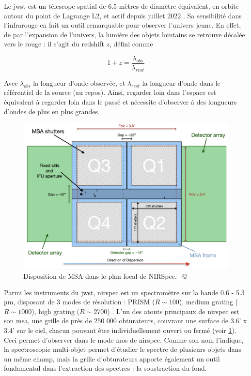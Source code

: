 \documentclass[11pt, a4paper]{article}
\newcommand{\customcite}[1]{\mbox{
  {\small \copyright} \cite{#1}}
}
\begin{document}
Le \gls{jwst} est un télescope spatial de 6.5 mètres de diamètre équivalent, en orbite autour du point de Lagrange L2, et actif depuis juillet 2022 . Sa sensibilité dans l'infrarouge en fait un outil remarquable pour observer l'univers jeune. En effet, de par l'expansion de l'univers, la lumière des objets lointains se retrouve décalée vers le rouge : il s'agit du redshift $z$, défini comme 

\begin{equation}
    1 + z = \frac{\lambda_{obs}}{\lambda_{rest}}
\end{equation}

Avec $\lambda_{obs}$ la longueur d'onde observée, et $\lambda_{rest}$ la longueur d'onde dans le référentiel de la source (au repos). Ainsi, regarder loin dans l'espace est équivalent à regarder loin dans le passé et nécessite d'observer à des longueurs d'ondes de plus en plus grandes.

\begin{figure}[!h]
  \centering
  \includegraphics[scale=0.3]{assets/msa_ds_new.png}
  \caption{Disposition de MSA dans le plan focal de NIRSpec. \customcite{2022A&A...661A..81F}}
  \label{fig:msa_shutter}
\end{figure}

Parmi les instruments du \gls{jwst}, \gls{nirspec} est un spectromètre sur la bande 0.6 - 5.3  µm, disposant de 3 modes de résolution : PRISM ($R \sim 100$), medium grating ($R \sim 1000$), high grating ($R \sim 2700$) . L'un des atouts principaux de \gls{nirspec} est son \gls{msa}, une grille de près de 250 000 obturateurs, couvrant une surface de 3.6' x 3.4' sur le ciel, chacun pouvant être individuellement ouvert ou fermé  (voir \ref{fig:msa_shutter}). Ceci permet d'observer dans le mode \gls{mos} de \gls{nirspec}. Comme son nom l'indique, la spectroscopie multi-objet permet d'étudier le spectre de plusieurs objets dans un même champ, mais la grille d'obturateurs apporte également un outil fondamental dans l'extraction des spectres : la soustraction du fond.\\
\end{document}
